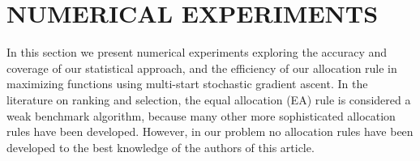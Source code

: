 \documentclass[12pt,english]{article}
\newcommand{\abbrv}{MLS}
\begin{document}




\section{NUMERICAL EXPERIMENTS}
\label{experiments}

In this section we present numerical experiments exploring the accuracy and coverage of our statistical approach, and the efficiency of our allocation rule in maximizing functions using multi-start stochastic gradient ascent. In the literature on ranking and selection, the equal allocation (EA) rule is considered a weak benchmark algorithm, because many other more sophisticated allocation rules have been developed. However, in our problem no allocation rules have been developed to the best knowledge of the authors of this article.
\end{document}
